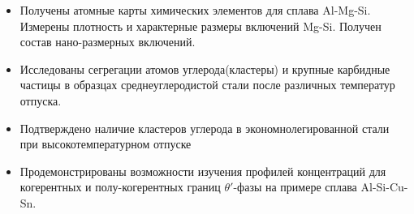 \begin{enumerate}[beginpenalty=10000]
	\begin{itemize}
		\item Получены атомные карты химических элементов для сплава Al-Mg-Si. Измерены плотность и характерные размеры включений Mg-Si. Получен состав нано-размерных включений.
		\item Исследованы сегрегации атомов углерода(кластеры) и крупные карбидные частицы в образцах среднеуглеродистой стали после различных температур отпуска.
		\item Подтверждено наличие кластеров углерода в экономнолегированной стали при высокотемпературном отпуске
		\item Продемонстрированы возможности изучения профилей концентраций для когерентных и полу-когерентных границ $\theta '$-фазы на примере сплава Al-Si-Cu-Sn.
	\end{itemize}
\end{enumerate}

